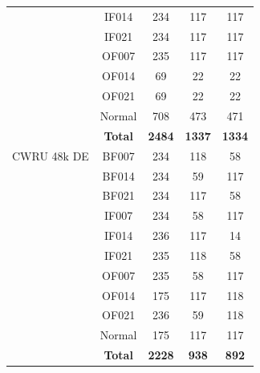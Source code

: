 \documentclass[journal]{IEEEtran}
\begin{document}
\begin{table}[!t]
\begin{tabular}{lcccc}
 & IF014  & 234 & 117 & 117 \\
 & IF021  & 234 & 117 & 117 \\
 & OF007  & 235 & 117 & 117 \\
 & OF014  & 69  & 22  & 22  \\
 & OF021  & 69  & 22  & 22  \\
 & Normal & 708 & 473 & 471 \\
 & \textbf{Total} & \textbf{2484} & \textbf{1337} & \textbf{1334} \\
\midrule
CWRU 48k DE & BF007  & 234 & 118 & 58  \\
 & BF014  & 234 & 59  & 117 \\
 & BF021  & 234 & 117 & 58  \\
 & IF007  & 234 & 58  & 117 \\
 & IF014  & 236 & 117 & 14  \\
 & IF021  & 235 & 118 & 58  \\
 & OF007  & 235 & 58  & 117 \\
 & OF014  & 175 & 117 & 118 \\
 & OF021  & 236 & 59  & 118 \\
 & Normal & 175 & 117 & 117 \\
 & \textbf{Total} & \textbf{2228} & \textbf{938}  & \textbf{892}  \\
\bottomrule
\end{tabular}
\end{table}
\end{document}
